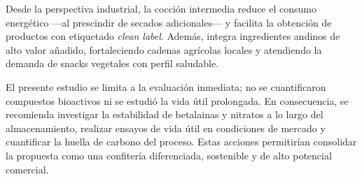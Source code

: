 \documentclass[manuscript,screen,review]{acmart}
\begin{document}
Desde la perspectiva industrial, la cocción intermedia reduce el consumo energético —al prescindir de secados adicionales— y facilita la obtención de productos con etiquetado \emph{clean label}. Además, integra ingredientes andinos de alto valor añadido, fortaleciendo cadenas agrícolas locales y atendiendo la demanda de snacks vegetales con perfil saludable.

El presente estudio se limita a la evaluación inmediata; no se cuantificaron compuestos bioactivos ni se estudió la vida útil prolongada. En consecuencia, se recomienda investigar la estabilidad de betalainas y nitratos a lo largo del almacenamiento, realizar ensayos de vida útil en condiciones de mercado y cuantificar la huella de carbono del proceso. Estas acciones permitirían consolidar la propuesta como una confitería diferenciada, sostenible y de alto potencial comercial.
































\makeatletter
\let\section\ACM@origsection
\let\subsection\ACM@origsubsection
\let\subsubsection\ACM@origsubsubsection
\makeatother


\end{document}
